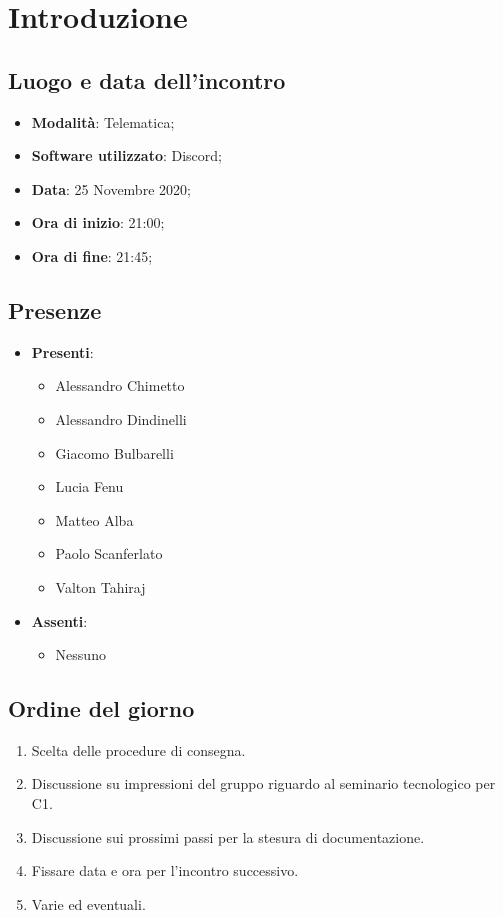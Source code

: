 \documentclass[]{article}
\begin{document}
	
	
	
	\newpage
	
	\section{Introduzione}
	\subsection{Luogo e data dell'incontro}
	\begin{itemize}
		\item \textbf{Modalità}: Telematica;
		\item \textbf{Software utilizzato}: Discord;
		\item \textbf{Data}: 25 Novembre 2020;
		\item \textbf{Ora di inizio}: 21:00;
		\item \textbf{Ora di fine}: 21:45;
	\end{itemize}
	
	\subsection{Presenze}
	\begin{itemize}
		\item \textbf{Presenti}: 
		\begin{itemize}
			\item Alessandro Chimetto
			\item Alessandro Dindinelli
			\item Giacomo Bulbarelli
			\item Lucia Fenu
			\item Matteo Alba
			\item Paolo Scanferlato
			\item Valton Tahiraj
		\end{itemize}
		\item \textbf{Assenti}:
		\begin{itemize}
			\item Nessuno
		\end{itemize}
	\end{itemize}
	
	
	\subsection{Ordine del giorno}
	\begin{enumerate}
		\item Scelta delle procedure di consegna.
		\item Discussione su impressioni del gruppo riguardo al seminario
		tecnologico per C1.
		\item Discussione sui prossimi passi per la stesura di documentazione.
		\item Fissare data e ora per l'incontro successivo.
		\item Varie ed eventuali.
	\end{enumerate}
	
\end{document}
